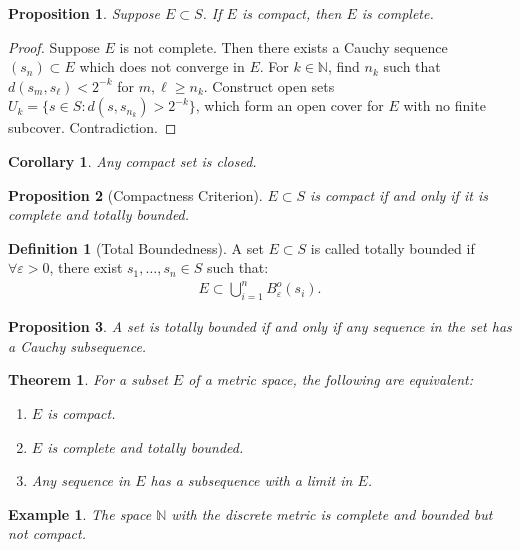 \documentclass[7pt]{article}
\theoremstyle{definition}
\newtheorem{definition}{Definition}
\theoremstyle{plain}
\newtheorem{theorem}{Theorem}
\newtheorem{proposition}{Proposition}
\newtheorem{example}{Example}
\newtheorem{corollary}{Corollary}
\begin{document}
\begin{proposition}
Suppose $ E \subset S $. If $ E $ is compact, then $ E $ is complete.
\end{proposition}

\begin{proof}
Suppose $ E $ is not complete. Then there exists a Cauchy sequence $ (s_n) \subset E $ which does not converge in $ E $. For $ k \in \mathbb{N} $, find $ n_k $ such that $ d(s_m, s_\ell) < 2^{-k} $ for $ m, \ell \geq n_k $. Construct open sets $ U_k = \{s \in S : d(s, s_{n_k}) > 2^{-k}\} $, which form an open cover for $ E $ with no finite subcover. Contradiction.
\end{proof}

\begin{corollary}
Any compact set is closed.
\end{corollary}

\begin{proposition}[Compactness Criterion]
$ E \subset S $ is compact if and only if it is complete and totally bounded.
\end{proposition}

\begin{definition}[Total Boundedness]
A set $ E \subset S $ is called totally bounded if $ \forall \varepsilon > 0 $, there exist $ s_1, \ldots, s_n \in S $ such that:
\begin{align}
E \subset \bigcup_{i=1}^n B_\varepsilon^o(s_i).
\end{align}
\end{definition}

\begin{proposition}
A set is totally bounded if and only if any sequence in the set has a Cauchy subsequence.
\end{proposition}

\begin{theorem}
For a subset $ E $ of a metric space, the following are equivalent:
\begin{enumerate}
    \item $ E $ is compact.
    \item $ E $ is complete and totally bounded.
    \item Any sequence in $ E $ has a subsequence with a limit in $ E $.
\end{enumerate}
\end{theorem}

\begin{example}
The space $ \mathbb{N} $ with the discrete metric is complete and bounded but not compact.
\end{example}
\end{document}
